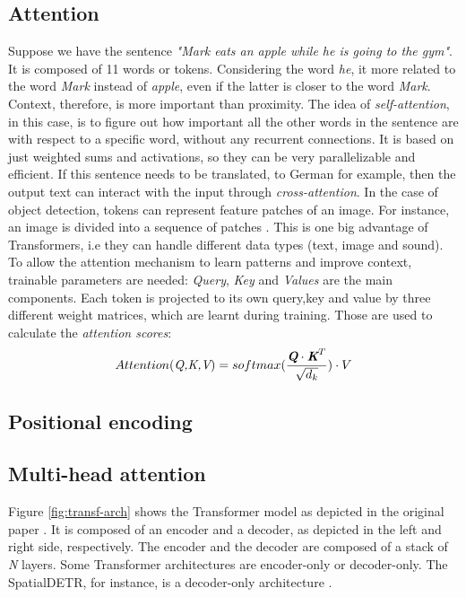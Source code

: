 \subsection{Attention}
Suppose we have the sentence \emph{"Mark eats an apple while he is going to the gym"}. It is composed of 11 words or tokens. Considering the word \emph{he}, it more related to the word \emph{Mark} instead of \emph{apple}, even if the latter is closer to the word \emph{Mark}. Context, therefore, is more important than proximity. The idea of \emph{self-attention}, in this case, is to figure out how important all the other words in the sentence are with respect to a specific word, without any recurrent connections. It is based on just weighted sums and activations, so they can be very parallelizable and efficient. If this sentence needs to be translated, to German for example, then the output text can interact with the input through \emph{cross-attention}.
In the case of object detection, tokens can represent feature patches of an image. For instance, an image is divided into a sequence of patches \cite{dosovitskiy2020image}\cite{carion2020end}. This is one big advantage of Transformers, i.e they can handle different data types (text, image and sound).
To allow the attention mechanism to learn patterns and improve context, trainable parameters are needed: \emph{Query}, \emph{Key} and \emph{Values} are the main components. Each token is projected to its own query,key and value by three different weight matrices, which are learnt during training. Those are used to calculate the \emph{attention scores}:
\begin{equation}
    Attention(\emph{Q,K,V}) = softmax(\frac{\emph{\textbf{Q}} \cdot \emph{\textbf{K}}^T}{\sqrt{d_{k}}}) \cdot V
\end{equation}


\subsection{Positional encoding}

\subsection{Multi-head attention}

Figure \ref{fig:transf-arch} shows the Transformer model as depicted in the original paper \cite{Att.2017}. It is composed of an encoder and a decoder, as depicted in the left and right side, respectively. The encoder and the decoder are composed of a stack of \emph{N} layers. Some Transformer architectures are encoder-only or decoder-only. The SpatialDETR, for instance, is a decoder-only architecture \cite{doll2022spatialdetr}.


